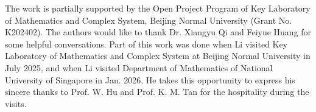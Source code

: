 \documentclass[11pt]{amsart}
\theoremstyle{plain}
\numberwithin{equation}{subsection}
\newtheorem{remark}[theorem]{Remark}
\begin{document}
\bigskip

\bigskip

The work is partially supported by the Open Project Program of Key Laboratory of Mathematics and Complex
System, Beijing Normal University (Grant No. K202402).
The authors would like to thank Dr. Xiangyu Qi and Feiyue Huang for some helpful conversations.
Part of this work was done when Li visited Key Laboratory of Mathematics and Complex
System at Beijing Normal University in July 2025, and when Li visited Department of Mathematics of National University of Singapore in Jan. 2026. 
He takes this opportunity to express his sincere thanks to
Prof. W. Hu  and Prof. K. M. Tan for the hospitality during the visits. 
\end{document}
